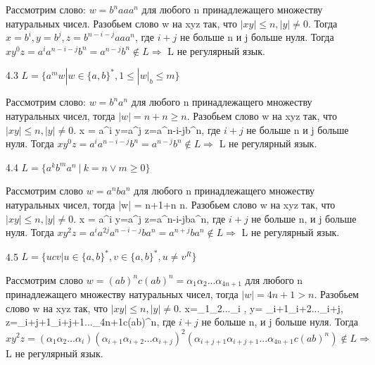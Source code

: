 \documentclass{article}
\begin{document}
Рассмотрим слово: \(w = b^n aaa^n\) для любого n принадлежащего множеству натуральных чисел. Разобьем слово w на xyz так, что \(|xy| \leq n, |y|\neq 0\).
Тогда \(x = b^i, y = b^j, z=b^{n-i-j} aaa^n\), где \(i+j\) не больше n и j больше нуля.
Тогда \(xy^0z=a^ia^{n-i-j} b^n=a^{n-j}b^n \notin L \Rightarrow\) L не регулярный язык.
\newline

4.3 \(L = \{a^mw | w \in \{a, b\}^*, 1 \leq |w|_b \leq m\}\)

Рассмотрим слово: \(w = b^n a^n\) для любого n принадлежащего множеству натуральных чисел, тогда \(|w| = n + n \geq n\). Разобьем слово w на xyz так, что \(|xy| \leq n, |y|\neq 0\).
x = a^i y=a^j z=a^{n-i-j}b^n, где \(i+j\) не больше n и j больше нуля. 
Тогда \(xy^0z=a^ia^{n-i-j}b^n=a^{n-j}b^n \notin L \Rightarrow\) L не регулярный язык.
\newline

4.4 \(L = \{a^kb^ma^n \ | \ k = n \vee m \ge 0\}\)

Рассмотрим слово \(w = a^n b a^n\) для любого n принадлежащего множеству натуральных чисел, тогда |w| = n+1+n \gt n. Разобьем слово w на xyz так, что \(|xy| \leq n,
|y|\neq 0\).
x = a^i y=a^j z=a^{n-i-j}ba^n, где \(i+j\) не больше n, и j больше нуля. 
Тогда \(xy^2z=a^ia^{2j}a^{n-i-j}ba^n=a^{n+j}ba^n \notin L \Rightarrow\) L не регулярный язык.
\newline

4.5 \(L = \{ucv | u \in \{a, b\}^*, v \in \{a, b\}^*, u \neq v^R\}\)

Рассмотрим слово \(w = (ab)^nc(ab)^n = \alpha_1\alpha_2...\alpha_{4n+1} \) для любого n принадлежащего множеству натуральных чисел, тогда \(|w| = 4n+1 \gt n\). Разобьем слово w на xyz так, что \(|xy| \leq n, |y|\neq 0\).
x=\alpha_1\alpha_2...\alpha_i , y= \alpha_{i+1}\alpha_{i+2}...\alpha_{i+j}, z=\alpha_{i+j+1}\alpha_{i+j+1}...\alpha_{4n+1}c(ab)^n, где \(i+j\) не больше n, и j больше нуля.
Тогда \(xy^2z=(\alpha_1\alpha_2...\alpha_i)(\alpha_{i+1}\alpha_{i+2}...\alpha_{i+j})^2(\alpha_{i+j+1}\alpha_{i+j+1}...\alpha_{4n+1}c(ab)^n) \notin L \Rightarrow\) L не регулярный язык.
\newline
\end{document}
